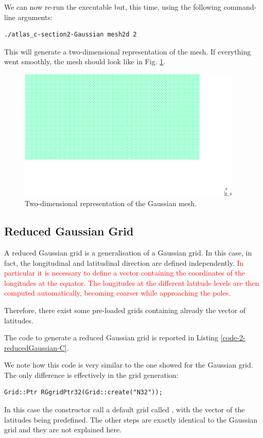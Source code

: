 %
We can now re-run the executable but, this time, using the following
command-line arguments:
%
\begin{lstlisting}[style=BashStyle]
./atlas_c-section2-Gaussian mesh2d 2
\end{lstlisting}
% 
This will generate a two-dimensional representation of the mesh.
If everything went smoothly, the mesh should look like in Fig. 
\ref{fig:section2-Gaussian-2d}.
%
\begin{figure}[H]
  \centering
    \includegraphics[width=0.95\textwidth]{imgs/Gaussian_2d}
    \caption{Two-dimensional representation of the Gaussian mesh.}
    \label{fig:section2-Gaussian-2d}
\end{figure}
%


\subsection{Reduced Gaussian Grid}
A reduced Gaussian grid is a generalisation of a Gaussian grid. 
In this case, in fact, the longitudinal and latitudinal direction
are defined independently. \textcolor{red}{In particular it is 
necessary to define a vector containing the coordinates of the 
longitudes at the equator. The longitudes at the different latitude 
levels are then computed automatically, becoming coarser while 
approaching the poles.}

Therefore, there exist some pre-loaded grids containing already 
the vector of latitudes. 

The code to generate a reduced Gaussian grid is reported in 
Listing \ref{code-2-reducedGaussian-C}.
%

%
We note how this code is very similar to the one showed for the 
Gaussian grid. The only difference is effectively in the grid 
generation:
%
\begin{lstlisting}[style=CStyleNoLine]
Grid::Ptr RGgridPtr32(Grid::create("N32"));
\end{lstlisting}
%
In this case the constructor call a default grid called ,
with the vector of the latitudes being predefined. The other steps 
are exactly identical to the Gaussian grid and they are not explained 
here.

